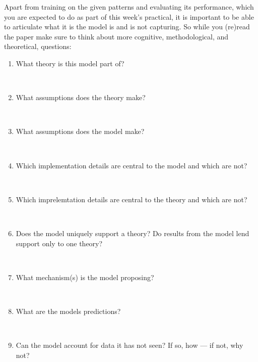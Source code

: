 \documentclass[a4paper,10pt]{article}
\begin{document}
Apart from training on the given patterns and evaluating its performance, which you are expected to do as part of this week's practical, it is important to be able to articulate what it is the model is and is not capturing.
So while you (re)read  the paper make sure to think about more cognitive, methodological, and theoretical, questions:
\begin{enumerate}


 \item What theory is this model part of?
 
\ \\

 
 \item What assumptions does the theory make? 

\ \\

 
 \item What assumptions does the model make? 

 
\ \\

 \item Which implementation details are central to the model and which are not? 

 
\ \\

 \item Which imprelemtation details are central to the theory and which are not? 

 
\ \\

 \item Does the model uniquely support a theory? Do results from the model lend support only to one theory? 

 
\ \\

 \item  What mechanism(s) is the model proposing?

 
\ \\

\item   What are the models predictions? 

\ \\

\item Can the model account for data it has not seen? If so, how --- if not, why not? 

\ \\

\end{enumerate}
\end{document}
